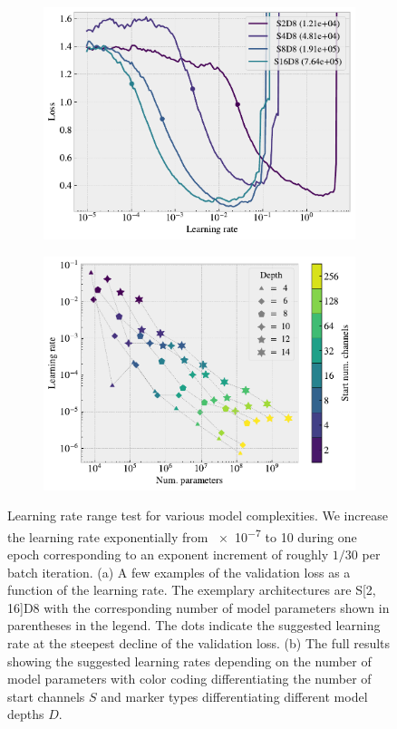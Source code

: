 \begin{figure}[H]
  \centering
  \begin{subfigure}[t]{0.49\textwidth}
      \centering
      \includegraphics[width=\textwidth]{figures/ML/LR_range_specific.pdf}
      \caption{}
  \end{subfigure}
  \hfill
  \begin{subfigure}[t]{0.49\textwidth}
      \centering
      \includegraphics[width=\textwidth]{figures/ML/LR_range_full.pdf}
      \caption{}
  \end{subfigure}
  \hfill
  \caption{Learning rate range test for various model complexities. We increase the learning rate exponentially from \num{e-7} to 10 during one epoch corresponding to an exponent increment of roughly $1/30$ per batch iteration. (a) A few examples of the validation loss as a function of the learning rate. The exemplary architectures are S[2, 16]D8 with the corresponding number of model parameters shown in parentheses in the legend. The dots indicate the suggested learning rate at the steepest decline of the validation loss. (b) The full results showing the suggested learning rates depending on the number of model parameters with color coding differentiating the number of start channels $S$ and marker types differentiating different model depths $D$. }
  \label{fig:LR_range}
\end{figure}


